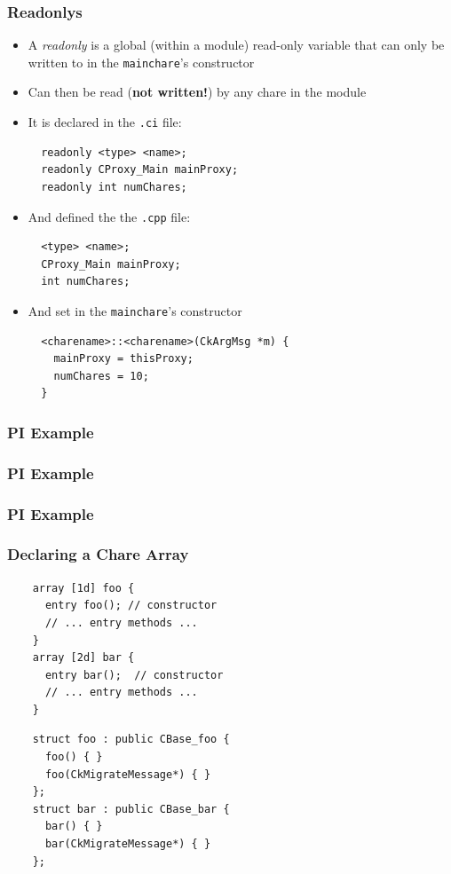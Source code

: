 \begin{frame}[fragile]
  \frametitle{Readonlys}
  \begin{itemize}
  \item A \textit{readonly} is a global (within a module) read-only variable
    that can only be written to in the \texttt{mainchare}'s constructor
  \item Can then be read (\textbf{not written!}) by any chare in the module
  \item It is declared in the \texttt{.ci} file:
\begin{lstlisting}
  readonly <type> <name>;
  readonly CProxy_Main mainProxy;
  readonly int numChares;
\end{lstlisting}
  \item And defined the the \texttt{.cpp} file:
\begin{lstlisting}
  <type> <name>;
  CProxy_Main mainProxy;
  int numChares;
\end{lstlisting}
  \item And set in the \texttt{mainchare}'s constructor
\begin{lstlisting}
  <charename>::<charename>(CkArgMsg *m) {
    mainProxy = thisProxy;
    numChares = 10;
  }
\end{lstlisting}


  \end{itemize}
\end{frame}

\begin{frame}[fragile]
  \frametitle{PI Example}
    
\end{frame}

\begin{frame}[fragile]
  \frametitle{PI Example}
  
\end{frame}

\begin{frame}[fragile]
  \frametitle{PI Example}
  
\end{frame}


\begin{frame}[fragile]
  \frametitle{Declaring a Chare Array}
  \begin{lstlisting}
    array [1d] foo {
      entry foo(); // constructor
      // ... entry methods ...
    }
    array [2d] bar {
      entry bar();  // constructor
      // ... entry methods ...
    }
  \end{lstlisting}

  \begin{lstlisting}
    struct foo : public CBase_foo {
      foo() { }
      foo(CkMigrateMessage*) { }
    };
    struct bar : public CBase_bar {
      bar() { }
      bar(CkMigrateMessage*) { }
    };
  \end{lstlisting}
\end{frame}

